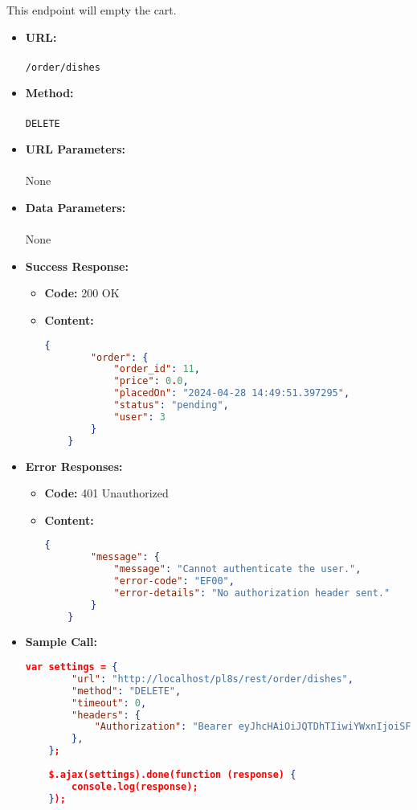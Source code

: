 

This endpoint will empty the cart.

\begin{itemize}
    \item \textbf{URL:} \\\\\texttt{/order/dishes}
    \item \textbf{Method:} \\\\\texttt{DELETE}
    \item \textbf{URL Parameters:} \\\\None
    \item \textbf{Data Parameters:}\\\\None
    \item \textbf{Success Response:}
		\begin{itemize}
			\item[$\circ$] \textbf{Code:} 200 OK
			\item[] \textbf{Content:}
			\medskip
			\begin{lstlisting}[language=json]
	{
		"order": {
			"order_id": 11,
			"price": 0.0,
			"placedOn": "2024-04-28 14:49:51.397295",
			"status": "pending",
			"user": 3
		}
	}
			\end{lstlisting}
		\end{itemize}
	   \item \textbf{Error Responses:}
    	\begin{itemize}
			\item[$\circ$] \textbf{Code:} 401 Unauthorized
			\item[] \textbf{Content:}
			\begin{lstlisting}[language=json]
	{
		"message": {
			"message": "Cannot authenticate the user.",
			"error-code": "EF00",
			"error-details": "No authorization header sent."
		}
	}
			\end{lstlisting}
		\end{itemize}	
    \item \textbf{Sample Call:}
		\begin{lstlisting}[language=json]		
	var settings = {
		"url": "http://localhost/pl8s/rest/order/dishes",
		"method": "DELETE",
		"timeout": 0,
		"headers": {
			"Authorization": "Bearer eyJhcHAiOiJQTDhTIiwiYWxnIjoiSFM1MTIifQ.eyJ1aWQiOjMsInJvbCI6ImN1cRvbW VyIiwic3RyIjoiY3VzX1B3OHJKbmd5eldOcmZ5IiwiZGF0IjoxNzE0MzQyN jAxNjMwf Q.RrH8ojpudntUVEZVnbvVw1GpUEU56tdnhnCSrnCqoHgUAwMMxXJDcT MfKazQmrIZ_ OSfges7-lECny6p-t5ITA"
		},
	};
	
	$.ajax(settings).done(function (response) {
		console.log(response);
	});
	\end{lstlisting}
  \end{itemize}		
